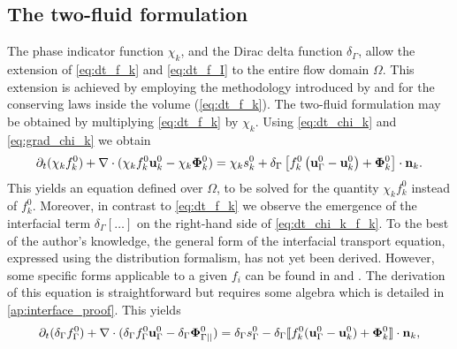 \subsection{The two-fluid formulation}
The phase indicator function $\chi_k$, and the Dirac delta function $\delta_\Gamma $, allow the extension of \ref{eq:dt_f_k} and \ref{eq:dt_f_I} to the entire flow domain $\Omega$. 
This extension is achieved by employing the methodology introduced by \citet{drew1983mathematical} and \citet{kataoka1986local} for the conserving laws inside the volume (\ref{eq:dt_f_k}).
The two-fluid formulation may be obtained by multiplying \ref{eq:dt_f_k} by $\chi_k$. 
Using \ref{eq:dt_chi_k} and \ref{eq:grad_chi_k} we obtain
\begin{equation}
    \pddt (\chi_k f_k^0)
    + \div (
        \chi_k f_k^0 \textbf{u}_k^0
        - \chi_k \mathbf{\Phi}_k^0 
        )
    = 
    \chi_k s_k^0
    + \delta_\Gamma \left[
        f_k^0
        \left(
            \textbf{u}_\Gamma^0
            - \textbf{u}_k^0
        \right)
        + \mathbf{\Phi}_k^0
    \right]
    \cdot \textbf{n}_k.
    \label{eq:dt_chi_k_f_k}
\end{equation}
This yields an equation defined over $\Omega$, to be solved for the quantity $\chi_k f_k^0$ instead of $f_k^0$. 
Moreover, in contrast to \ref{eq:dt_f_k} we observe the emergence of the interfacial term $ \delta_\Gamma [\ldots]$ on the right-hand side of \ref{eq:dt_chi_k_f_k}. 
To the best of the author's knowledge, the general form of the interfacial transport equation, expressed using the distribution formalism, has not yet been derived. However, some specific forms applicable to a given $f_i$ can be found in \citet{marle1982macroscopic} and  \citet{teigen2009}.
The derivation of this equation is straightforward but requires some algebra which is detailed in \ref{ap:interface_proof}. This yields%
\begin{equation}
    \pddt (\delta_\Gamma f_\Gamma^0)  
    + \div (
        \delta_\Gamma  f_\Gamma^0 \textbf{u}_\Gamma^0
        - \delta_\Gamma  \mathbf{\Phi}_{\Gamma||}^0 
        )
    = 
    \delta_\Gamma s_\Gamma^0
    - \delta_\Gamma \Jump{
    f_k^0 (\textbf{u}_\Gamma^0 - \textbf{u}_k^0)
    + \mathbf{\Phi}_k^0},
    \label{eq:dt_delta_I_f_I}
\end{equation}
